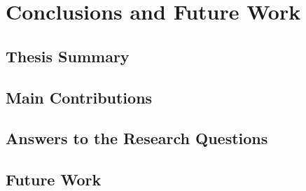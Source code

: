 \chapter{Conclusions and Future Work}
\label{cha:conclusions-and-future-work}

\section{Thesis Summary}

\section{Main Contributions}

\section{Answers to the Research Questions}

\section{Future Work}
